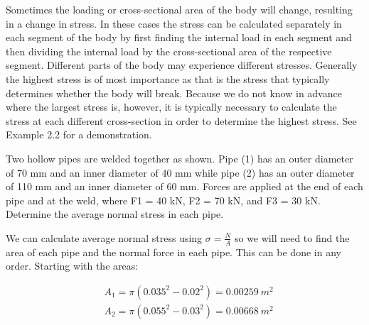\documentclass[
  letterpaper,
  DIV=11,
  numbers=noendperiod]{scrreprt}
\theoremstyle{definition}
\theoremstyle{remark}
\begin{document}
Sometimes the loading or cross-sectional area of the body will change,
resulting in a change in stress. In these cases the stress can be
calculated separately in each segment of the body by first finding the
internal load in each segment and then dividing the internal load by the
cross-sectional area of the respective segment. Different parts of the
body may experience different stresses. Generally the highest stress is
of most importance as that is the stress that typically determines
whether the body will break. Because we do not know in advance where the
largest stress is, however, it is typically necessary to calculate the
stress at each different cross-section in order to determine the highest
stress. See Example 2.2 for a demonstration.

\begin{tcolorbox}[enhanced jigsaw, leftrule=.75mm, colbacktitle=quarto-callout-tip-color!10!white, breakable, opacityback=0, colback=white, titlerule=0mm, toprule=.15mm, colframe=quarto-callout-tip-color-frame, coltitle=black, title={Example 2.2}, toptitle=1mm, bottomrule=.15mm, rightrule=.15mm, left=2mm, arc=.35mm, opacitybacktitle=0.6, bottomtitle=1mm]

Two hollow pipes are welded together as shown. Pipe (1) has an outer
diameter of 70 mm and an inner diameter of 40 mm while pipe (2) has an
outer diameter of 110 mm and an inner diameter of 60 mm. Forces are
applied at the end of each pipe and at the weld, where F1 = 40 kN, F2 =
70 kN, and F3 = 30 kN. Determine the average normal stress in each pipe.

\begin{tcolorbox}[enhanced jigsaw, leftrule=.75mm, colbacktitle=quarto-callout-tip-color!10!white, breakable, opacityback=0, colback=white, titlerule=0mm, toprule=.15mm, colframe=quarto-callout-tip-color-frame, coltitle=black, title={Solution}, toptitle=1mm, bottomrule=.15mm, rightrule=.15mm, left=2mm, arc=.35mm, opacitybacktitle=0.6, bottomtitle=1mm]

We can calculate average normal stress using \(\sigma=\frac{N}{A}\) so
we will need to find the area of each pipe and the normal force in each
pipe. This can be done in any order. Starting with the areas:

\[
\begin{aligned}
& A_1=\pi\left(0.035^2-0.02^2\right)=0.00259{~m}^2 \\
& A_2=\pi\left(0.055^2-0.03^2\right)=0.00668{~m}^2
\end{aligned}
\]


\end{tcolorbox}
\end{tcolorbox}
\end{document}
